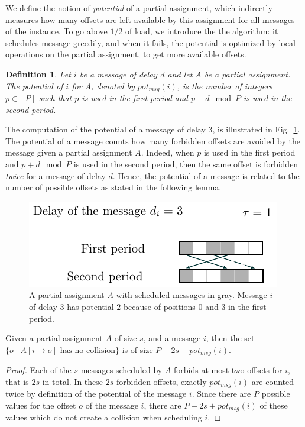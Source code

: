 \documentclass[pdflatex,sn-mathphys,iicol]{sn-jnl}%
\theoremstyle{thmstyleone}%
\theoremstyle{thmstyletwo}%
\theoremstyle{thmstylethree}%
\newtheorem{definition}{Definition}%
\begin{document}
We define the notion of \emph{potential} of a partial assignment, which indirectly measures how many offsets are left available by this assignment for all messages of the instance. To go above $1/2$ of load, we introduce the the \swapandmove algorithm: it schedules message greedily, and when it fails, the potential is optimized by local operations on the partial assignment, to get more available offsets. 

\begin{definition}
Let $i$ be a message of delay $d$ and let $A$ be a partial assignment.
The potential of $i$ for $A$, denoted by $pot_{msg}(i)$, is the number of integers $p \in [P]$ such that $p$ is used in the first period and $p+d \mod P$ is used in the second period. 
\end{definition}

The computation of the potential of a message of delay $3$, is illustrated in Fig.~\ref{fig:messagepotential}. The potential of a message counts how many forbidden offsets are avoided by the message given a partial assignment $A$.
Indeed, when $p$ is used in the first period and $p+d \mod P$ is used in the second period, then the same offset is forbidden \emph{twice} for a message of delay $d$. Hence, the potential of a message is related to the number of possible offsets as stated in the following lemma. 
\begin{figure}
\begin{center}
\includegraphics[scale=1]{messagepotential}
\end{center}
\caption{A partial assignment $A$ with scheduled messages in gray. Message $i$ of delay $3$ has potential $2$ because of positions $0$ and $3$ in the first period.}
\label{fig:messagepotential}
\end{figure}

\begin{lemma}\label{lemma:pot_msg}
Given a partial assignment $A$ of size $s$, and a message $i$, then the set $\{o \mid A[i \rightarrow o] \text{ has no collision}\}$ is of size $P - 2s + pot_{msg}(i)$.
\end{lemma}
\begin{proof}
 Each of the $s$ messages scheduled by $A$ forbids at most two offsets for $i$, that is $2s$ in total. In these $2s$ forbidden offsets, exactly $pot_{msg}(i)$ are counted twice by definition of the potential of the message $i$. Since there are $P$ possible values for the offset $o$ of the message $i$, there are $P - 2s + pot_{msg}(i)$ of these values which do not create a collision when scheduling $i$.\end{proof}
\end{document}
